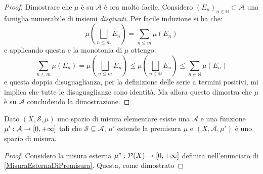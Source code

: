 \begin{proof}
	Dimostrare che $\mu$ è \sigadd{} su $\mathcal A$ è ora molto facile.
	Considero $(E_n)_{n\in\mathbb N}\subset \mathcal A$ una famiglia numerabile di insiemi \emph{disgiunti}. Per facile induzione si ha che:
	\begin{equation*}
		\mu\left(\bigsqcup_{n\le m}E_n\right)=\sum_{n\le m} \mu(E_n)
	\end{equation*}
	e applicando questa e la monotonia di $\mu$ ottengo:
	\begin{equation*}
		\sum_{n\le m} \mu(E_n)=\mu\left(\bigsqcup_{n\le m}E_n\right)\le
		\mu\left(\bigsqcup_{n\in\mathbb N}E_n\right)\le \sum_{n\in\mathbb N} \mu(E_n)
	\end{equation*}
	e questa doppia disuguaglianza, per la definizione delle serie a termini positivi, mi implica che tutte le disuguaglianze sono identità. Ma allora questo dimostra che $\mu$ è \sigadd{} su $\mathcal A$ concludendo la dimostrazione.
\end{proof}

\begin{theorem}
	Dato $(X,\mathcal S,\mu)$ uno spazio di misura elementare esiste una \sigalg{} $\mathcal A$ e una funzione $\mu':\mathcal A\to[0,+\infty]$ tali che $\mathcal S\subseteq \mathcal A$, $\mu'$ estende la premisura $\mu$ e $(X,\mathcal A,\mu')$ è uno spazio di misura.
\end{theorem}
\begin{proof}
	Considero la misura esterna $\mu^*:\mathcal P(X)\to[0,+\infty]$ definita nell'enunciato di \cref{MisuraEsternaDiPremisura}. Questa, come dimostrato 
\end{proof}




